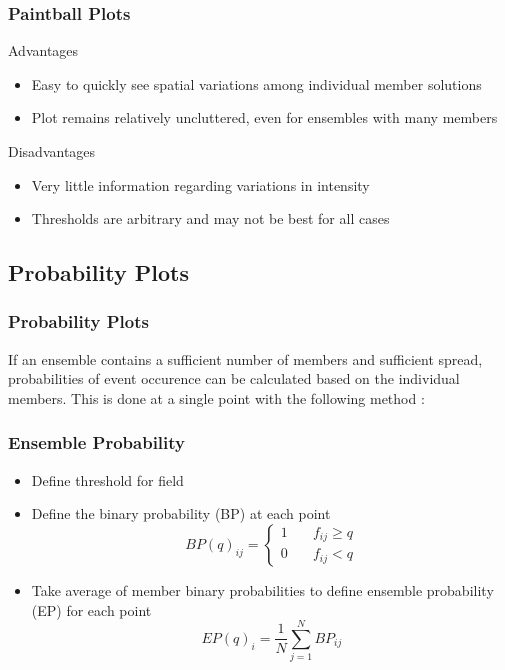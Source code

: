 \documentclass{beamer}
\begin{document}
\begin{frame}
  \frametitle{Paintball Plots}
  Advantages
  \begin{itemize}
    \item Easy to quickly see spatial variations among individual member solutions
    \item Plot remains relatively uncluttered, even for ensembles with many members
  \end{itemize}
  Disadvantages
  \begin{itemize}
    \item Very little information regarding variations in intensity
    \item Thresholds are arbitrary and may not be best for all cases
  \end{itemize}
\end{frame}

\subsection{Probability Plots}

\begin{frame}
  \frametitle{Probability Plots}
  If an ensemble contains a sufficient number of members and sufficient spread, probabilities of event occurence can be calculated based on the individual members. This is done at a single point with the following method \citep{Schwartz2017}:
\end{frame}


\begin{frame}
  \frametitle{Ensemble Probability}
\begin{itemize}
 \item Define threshold for field
 \item Define the binary probability (BP) at each point
 \begin{equation}
    BP(q)_{ij} = \left\{
        \begin{array}{ll}
            1 & \quad f_{ij} \geq q \\
            0 & \quad f_{ij} < q
        \end{array}
    \right.
   \end{equation} 

\item Take average of member binary probabilities to define ensemble probability (EP) for each point
\begin{equation}
     EP(q)_{i} = \frac{1}{N}\sum^{N}_{j=1}BP_{ij}
   \end{equation}
\end{itemize}
\end{frame}  
\end{document}
